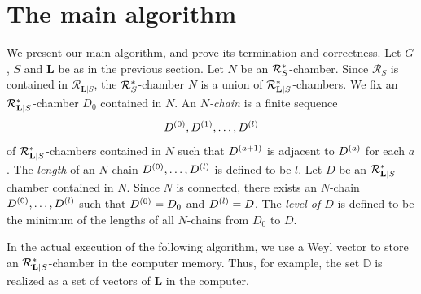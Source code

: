 \documentclass{amsart}
\theoremstyle{plain}
\theoremstyle{definition}
\theoremstyle{remark}
\numberwithin{equation}{section}
\numberwithin{table}{section}
\numberwithin{figure}{section}
\newcommand{\D}{\mathord{\mathbb D}}
\newcommand{\RRR}{\mathord{\mathcal R}}
\newcommand{\spar}[1]{\sp{(#1)}}
\renewcommand{\L}{\mathord{\mathbf{L}}}
\newcommand{\Chams}{\D}
\newcommand{\Roots}{\RRR}
\newcommand{\sphyp}{\sp*}
\newcommand{\RtsLS}{\Roots_{\L|S}}
\newcommand{\Nc}{N}
\begin{document}
\section{The main algorithm}\label{sec:main}
%
We present our main algorithm,
and prove its termination and correctness. 
Let $G$, $S$ and $\L$ be as in the previous section.
Let $\Nc$ be an $\Roots_S\sphyp$-chamber.
Since $\Roots_S$ is contained in $\RtsLS$,
the $\Roots_S\sphyp$-chamber $\Nc$ is a union of $\RtsLS\sphyp$-chambers.
We fix  an $\RtsLS\sphyp$-chamber $D_0$
contained in $\Nc$.
An \emph{$\Nc$-chain}  %
is a finite sequence 
$$
D\spar{0}, D\spar{1}, \dots, D\spar{l}
$$
of $\RtsLS\sphyp$-chambers  contained in $\Nc$ such that 
$D\spar{a+1}$ is adjacent to $D\spar{a}$ for each $a$.
The \emph{length} of an $\Nc$-chain  $D\spar{0}, \dots, D\spar{l}$ is 
defined to be $l$.
Let  $D$ be an $\RtsLS\sphyp$-chamber contained in $\Nc$.
Since $\Nc$ is connected,
there exists an $\Nc$-chain  $D\spar{0},  \dots, D\spar{l}$
such that $D\spar{0}=D_0$ and $D\spar{l}=D$.
The \emph{level  of $D$} is defined to be the minimum  of the lengths of all $\Nc$-chains 
from $D_0$ to $D$.
%
\par
In the actual execution of the following algorithm,
we use a Weyl vector to store an $\RtsLS\sphyp$-chamber 
in the computer memory.
Thus, for example,  the set $\Chams$ is realized  as a set of vectors of $\L$ in 
the computer.
%
%
\end{document}
